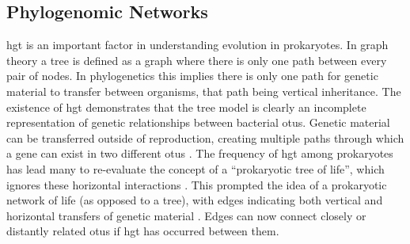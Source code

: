 \subsection{Phylogenomic Networks}
\ac{hgt} is an important factor in understanding evolution in prokaryotes.
In graph theory a tree is defined as a graph where there is only one path between every pair of nodes.
In phylogenetics this implies there is only one path for genetic material to transfer between organisms, that path being vertical inheritance.
The existence of \ac{hgt} demonstrates that the tree model is clearly an incomplete representation of genetic relationships between bacterial \ac{otu}s.
Genetic material can be transferred outside of reproduction, creating multiple paths through which a gene can exist in two different \ac{otu}s  \citep{lgt}.
The frequency of \ac{hgt} among prokaryotes has lead many to re-evaluate the concept of a ``prokaryotic tree of life'', which ignores these horizontal interactions \citep{netoflife}.
This prompted the idea of a prokaryotic network of life (as opposed to a tree), with edges indicating both vertical and horizontal transfers of genetic material \citep{netoflife}.
Edges can now connect closely or distantly related \ac{otu}s if \ac{hgt} has occurred between them.
